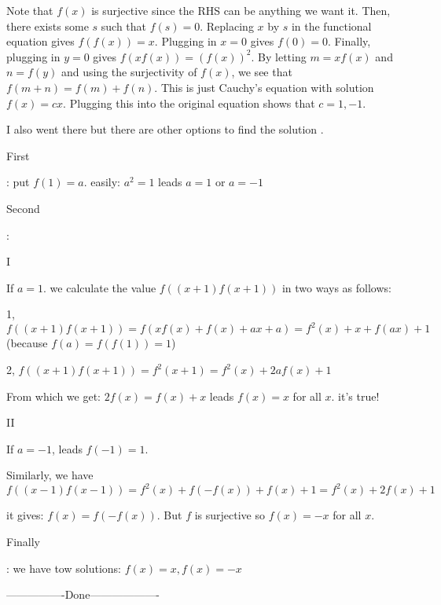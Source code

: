 \begin{solution}
	\begin{tcolorbox}Note that $f(x)$ is surjective since the RHS can be anything we want it. Then, there exists some $s$ such that $f(s)=0$. Replacing $x$ by $s$ in the functional equation gives $f(f(x))=x$. Plugging in $x=0$ gives $f(0)=0$. Finally, plugging in $y=0$ gives $f(xf(x))=(f(x))^{2}$. By letting $m=xf(x)$ and $n=f(y)$ and using the surjectivity of $f(x)$, we see that $f(m+n)=f(m)+f(n)$. This is just Cauchy's equation with solution $f(x)=cx$. Plugging this into the original equation shows that $c=1,-1$.\end{tcolorbox}

I also went there but there are other options to find the solution .

\begin{bolded}First\end{bolded}: put $f(1)=a$. easily: $a^2=1$ leads $a=1$ or $a=-1$

\begin{bolded}Second\end{bolded}:

\begin{bolded}I\end{bolded}\/ If $a=1$. we calculate the value $f ((x +1)f(x+1))$ in two ways as follows:

1, $f((x+1)f(x+1))=f(xf(x)+f(x)+ax+a)=f^2(x)+x+f(ax)+1$ (because $f(a)=f(f(1))=1$)  

2, $f((x+1)f(x+1))=f^2(x+1)=f^2(x)+2af(x)+1$

From which we get: $2f(x)=f(x)+x$ leads $f(x)=x$ for all $x$. it's true!

\begin{bolded}II\end{bolded}\/ If $a=-1$, leads $f(-1)=1$. 

Similarly, we have $f((x-1)f(x-1))=f^2(x)+f(-f(x))+f(x)+1=f^2(x)+2f(x)+1$

it gives: $f(x)=f(-f(x))$. But $f$ is surjective so $f(x)=-x$ for all $x$. 

\begin{bolded}Finally\end{bolded}: we have tow solutions: $f(x)=x, f(x)=-x$

----------------Done-------------------
\end{solution}



